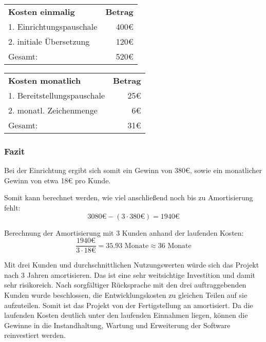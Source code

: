 \begin{center}
        \begin{tabular}{ l r }
            \textbf{Kosten einmalig} & \textbf{Betrag} \\
            1. Einrichtungspauschale & 400€ \\
            2. initiale Übersetzung\footnotemark[1] & 120€ \\
            \hline
            Gesamt: & 520€ \\
        \end{tabular}
        \hspace{2.9cm}
        \begin{tabular}{l r}
            \textbf{Kosten monatlich} & \textbf{Betrag} \\
            1. Bereitstellungspauschale & 25€ \\
            2. monatl. Zeichenmenge\footnotemark[1] & 6€\\
            \hline
            Gesamt: & 31€ \\
        \end{tabular}
\end{center}


\subsubsection{Fazit}
Bei der Einrichtung ergibt sich somit ein Gewinn von 380€, sowie ein monatlicher Gewinn von etwa 18€ pro Kunde.

Somit kann berechnet werden, wie viel anschließend noch bis zu Amortisierung fehlt:
\[
    3080\text{€} - (3 \cdot 380\text{€}) = 1940\text{€}
\]

Berechnung der Amortisierung mit 3 Kunden anhand der laufenden Kosten:
\[
    \frac{1940\text{€}}{3 \cdot 18\text{€}} = 35.93 \text{ Monate} \approx 36 \text{ Monate}
\]

Mit drei Kunden und durchschnittlichen Nutzungswerten würde sich das Projekt nach 3 Jahren amortisieren. 
Das ist eine sehr weitsichtige Investition und damit sehr risikoreich.
Nach sorgfältiger Rücksprache mit den drei auftraggebenden Kunden wurde beschlossen, die Entwicklungskosten zu gleichen Teilen auf sie aufzuteilen.
Somit ist das Projekt von der Fertigstellung an amortisiert. Da die laufenden Kosten deutlich unter den laufenden Einnahmen liegen, 
können die Gewinne in die Instandhaltung, Wartung und Erweiterung der Software reinvestiert werden.
 

